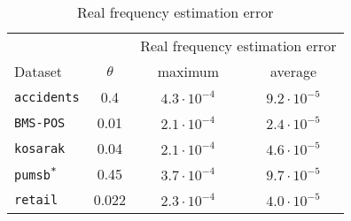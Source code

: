 \begin{table}[tb]
  \centering
\begin{tabular}{lccc}
\toprule
  & & \multicolumn{2}{c}{Real frequency estimation error} \\
 \cmidrule(l){3-4}
Dataset  & $\theta$ & maximum & average \\
\midrule
\texttt{accidents} & 0.4 & $4.3\cdot10^{-4}$ &  $9.2\cdot10^{-5}$ \\
\texttt{BMS-POS} & 0.01 & $2.1\cdot10^{-4}$ & $2.4\cdot10^{-5}$ \\
\texttt{kosarak} & 0.04 & $2.1\cdot10^{-4}$ & $4.6\cdot10^{-5}$ \\
\texttt{pumsb\textsuperscript{*}} & 0.45 & $3.7\cdot10^{-4}$ & $9.7\cdot10^{-5}$ \\
\texttt{retail} &  0.022 & $2.3\cdot10^{-4}$ & $4.0\cdot 10^{-5}$ \\
\bottomrule
\end{tabular}
\caption{Real frequency estimation error}
\label{table:freqapprox}
\end{table}

